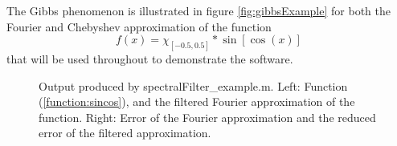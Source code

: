\documentclass[12pt]{article}
\begin{document}
The Gibbs phenomenon is illustrated in figure \ref{fig:gibbsExample} for both the Fourier and Chebyshev approximation of the function
\begin{equation}\label{function:sincos}
    f(x) = \chi_{[-0.5,0.5]} \ast \sin[\cos(x)]
\end{equation}
that will be used throughout to demonstrate the software.


\begin{figure}[tbh]
   \centering
 \caption{Output produced by spectralFilter\_example.m. Left: Function (\ref{function:sincos}), and the filtered Fourier approximation
 of the function.  Right: Error of the Fourier approximation and the
 reduced error of the filtered approximation.
          } \label{fig:spectralFilter}
 \end{figure}
\end{document}

